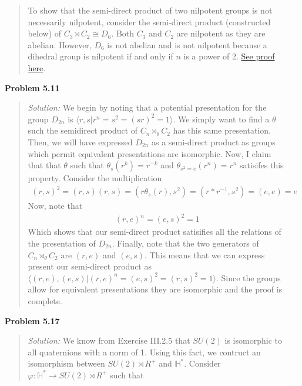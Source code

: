 \documentclass{article}
\newcommand{\Solution}{\textit{Solution: }}
\begin{document}
\begin{enumerate}
\begin{quote}
            To show that the semi-direct product of two nilpotent groups is not necessarily nilpotent, consider the semi-direct product (constructed below) of $C_3 \rtimes C_2 \cong D_6$. Both
            $C_3$ and $C_2$ are nilpotent as they are abelian. However, $D_6$ is not abelian and is not nilpotent because a dihedral group is nilpotent if and only if $n$ is a power of 2. 
            \href{https://math.stackexchange.com/questions/834966/is-the-dihedral-group-d-n-nilpotent-solvable}{See proof here}. \qedsymbol
        \end{quote}
        \item[\textbf{Problem 5.11}]
        \begin{quote}
           \Solution We begin by noting that a potential presentation for the group $D_{2n}$ is $\langle r,s \vert r^n = s^2 = (sr)^2 = 1 \rangle$. We simply want to find a $\theta$ such the semidirect product
           of $C_n \rtimes_\theta C_2$ has this same presentation.  Then, we will have expressed $D_{2n}$ as a semi-direct product as groups which permit equivalent presentations are isomorphic. Now, I claim that 
           that $\theta$ such that $\theta_s(r^k) = r^{-k}$ and $\theta_{s^2 = e}(r^n) = r^n$ satisifes this property. Consider the multiplication 
           \begin{align*}
                (r, s)^2 = (r, s)(r, s) = (r\theta_s(r), s^2) = (r*r^{-1}, s^2) = (e, e) = e
           \end{align*}
           Now, note that 
           \begin{align*}
               (r, e)^n = (e, s)^2 = 1
           \end{align*}
           Which shows that our semi-direct product satisifies all the relations of the presentation of $D_{2n}$. Finally, note that the two generators of $C_n \rtimes_\theta C_2$ are $(r, e)$ and $(e, s)$. This means
           that we can express present our semi-direct product as $\langle (r, e), (e, s) \vert (r, e)^n = (e, s)^2 = (r, s)^2 = 1 \rangle$. Since the groups allow for equivalent presentations they are isomorphic
           and the proof is complete. \qedsymbol
        \end{quote} 
        \item[\textbf{Problem 5.17}]
        \begin{quote}
            \Solution We know from Exercise III.2.5 that $SU(2)$ is isomorphic to all quaternions with a norm of 1. Using this fact, we contruct an isomorphism between 
            $SU(2) \rtimes R^+$ and $\mathbb{H}^*$. Consider $\varphi: \mathbb{H}^* \to SU(2) \rtimes R^+$ such that 

\end{quote}
\end{enumerate}
\end{document}
